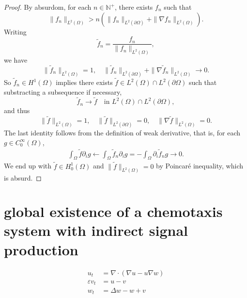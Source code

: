 \begin{proof}
	By absurdom, for each $n\in \mathbb{N}^+$, there exists $f_n$ such that
	\[
	\|f_n\|_{L^{2}(\Omega)} > n (\|f_n\|_{L^2(\partial\Omega)} + \|\nabla f_n\|_{L^2(\Omega)}).
	\]
	Writing
	\[
	\tilde{f}_n = \frac{f_n}{\|f_n\|_{L^2(\Omega)}},
	\]
	we have 
	\[
	\|\tilde f_n\|_{L^{2}(\Omega)} = 1,
	\quad \|\tilde f_n\|_{L^2(\partial\Omega)} + \|\nabla \tilde f_n\|_{L^2(\Omega)} \to 0.
	\]
	So $\tilde f_n\in H^1(\Omega)$ implies there exists $\tilde f\in L^2(\Omega)\cap L^2(\partial\Omega)$ such that substracting a subsequence if necessary,
	\[
	\tilde f_n\to \tilde f \quad\text{in } L^2(\Omega)\cap L^2(\partial\Omega),
	\]
	and thus 
	\[
	\|\tilde f\|_{L^2(\Omega)} = 1,
	\quad \|\tilde f\|_{L^2(\partial\Omega)} = 0,
	\quad \|\nabla\tilde f\|_{L^2(\Omega)} = 0.
	\]
	The last identity follows from the definition of weak derivative, that is,
	for each $g\in C^\infty_0(\Omega)$,
	\begin{align*}
		\int_\Omega \tilde f\partial_i g \leftarrow \int_\Omega \tilde f_n\partial_i g 
		= - \int_\Omega \partial_i \tilde f_n g \to 0. 
	\end{align*}
	We end up with $\tilde f\in H^1_0(\Omega)$ and $\|\tilde f\|_{L^2(\Omega)} = 0$ by Poincar\'e inequality,
	which is absurd.
\end{proof}


\section{global existence of a chemotaxis system with indirect signal production}
\begin{align}\label{sys: ks with isp}
  u_t &= \nabla\cdot(\nabla u - u\nabla w) \\
  \varepsilon v_t &= u - v \\
  w_t &= \Delta w - w + v
\end{align}

